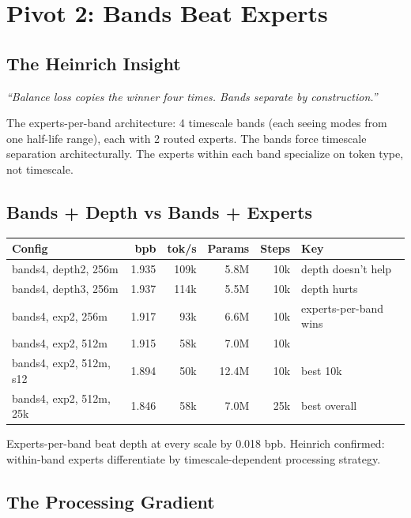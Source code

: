 \documentclass[11pt,a4paper]{report}
\newcommand{\cq}[1]{\textcolor{q}{\textit{``#1''}}}
\begin{document}
\chapter{Pivot 2: Bands Beat Experts}

\section{The Heinrich Insight}

\cq{Balance loss copies the winner four times. Bands separate by construction.}

The experts-per-band architecture: 4 timescale bands (each seeing modes from one half-life range), each with 2 routed experts. The bands force timescale separation architecturally. The experts within each band specialize on token type, not timescale.

\section{Bands + Depth vs Bands + Experts}

\begin{center}
\begin{tabular}{lrrrrl}
\toprule
Config & bpb & tok/s & Params & Steps & Key \\
\midrule
bands4, depth2, 256m & 1.935 & 109k & 5.8M & 10k & depth doesn't help \\
bands4, depth3, 256m & 1.937 & 114k & 5.5M & 10k & depth hurts \\
bands4, exp2, 256m & 1.917 & 93k & 6.6M & 10k & experts-per-band wins \\
bands4, exp2, 512m & 1.915 & 58k & 7.0M & 10k & \\
bands4, exp2, 512m, s12 & 1.894 & 50k & 12.4M & 10k & best 10k \\
bands4, exp2, 512m, 25k & 1.846 & 58k & 7.0M & 25k & best overall \\
\bottomrule
\end{tabular}
\end{center}

Experts-per-band beat depth at every scale by 0.018 bpb. Heinrich confirmed: within-band experts differentiate by timescale-dependent processing strategy.

\section{The Processing Gradient}
\end{document}
